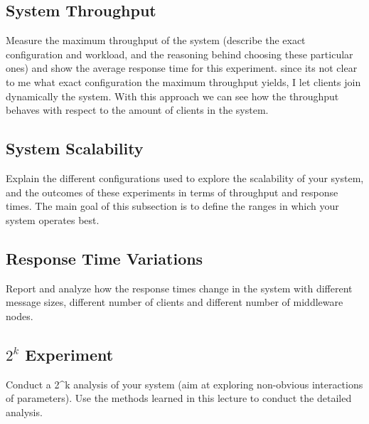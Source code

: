 \documentclass[11pt]{article}
\begin{document}
\subsection{System Throughput}\label{sec:system-throughput}

Measure the maximum throughput of the system (describe the exact
configuration and workload, and the reasoning behind choosing these
particular ones) and show the average response time for this experiment.
\newline
since its not clear to me what exact configuration the maximum throughput yields, I let clients join dynamically the system. With this approach we can see how the throughput behaves with respect to the amount of clients in the system.

\subsection{System Scalability}\label{sec:system-scalability}

Explain the different configurations used to explore the scalability of
your system, and the outcomes of these experiments in terms of
throughput and response times. The main goal of this subsection is to
define the ranges in which your system operates best.

\subsection{Response Time Variations}\label{sec:response-time-variations}

Report and analyze how the response times change in the system with
different message sizes, different number of clients and different
number of middleware nodes.

\subsection{$2^k$ Experiment}\label{sec:k-experiment}

Conduct a 2\^{}k analysis of your system (aim at exploring non-obvious
interactions of parameters). Use the methods learned in this lecture to
conduct the detailed analysis.
\end{document}
